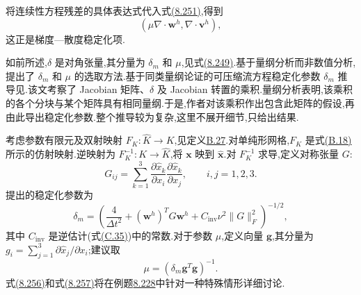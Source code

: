 \begin{note}[梯度—散度稳定化]
\label{note:vms-grad-div-stabilization}
将连续性方程残差的具体表达式代入式\hyperref[eq:vms-residual-based-resolved-formulation]{(8.251)},得到
\[
 (\mu\nabla\cdot\bm{w}^h,\nabla\cdot\bm{v}^h),
\]
这正是梯度—散度稳定化项.
\end{note}

\begin{note}
\label{note:vms-stabilization-parameter}
如前所述,$\delta$ 是对角张量,其分量为 $\delta_m$ 和 $\mu$,见式\hyperref[eq:vms-residual-parameter-tensor]{(8.249)}.\textcite{Bazilevs2007}基于量纲分析而非数值分析,提出了 $\delta_m$ 和 $\mu$ 的选取方法.基于同类量纲论证的可压缩流方程稳定化参数 $\delta_m$ 推导见\textcite{ShakibHughesJohan1991}.该文考察了 Jacobian 矩阵、$\delta$ 及 Jacobian 转置的乘积.量纲分析表明,该乘积的各个分块与某个矩阵具有相同量纲.于是,作者对该乘积作出包含此矩阵的假设,再由此导出稳定化参数.整个推导较为复杂,这里不展开细节,只给出结果.

考虑参数有限元及双射映射 $F_K:\widehat K\to K$,见定义\hyperref[def:appendix-b-27]{B.27}.对单纯形网格,$F_K$ 是式\hyperref[eq:appendix-b-18]{(B.18)}所示的仿射映射.逆映射为 $F_K^{-1}:K\to\widehat K$,将 $\bm{x}$ 映到 $\widehat{\bm{x}}$.对 $F_K^{-1}$ 求导,定义对称张量 $G$:
\[
 G_{ij}=\sum_{k=1}^{3}
 \frac{\partial\widehat{x}_k}{\partial x_i}
 \frac{\partial\widehat{x}_k}{\partial x_j},
 \qquad i,j=1,2,3.
\]
\textcite{Bazilevs2007}提出的稳定化参数为
\begin{equation}\label{eq:vms-momentum-stabilization-parameter}
 \delta_m=\left(
 \frac{4}{\Delta t^2}
 + (\bm{w}^h)^T G\bm{w}^h
 + C_{\mathrm{inv}}\nu^2\|G\|_F^2
 \right)^{-1/2},
\end{equation}
其中 $C_{\mathrm{inv}}$ 是逆估计(式\hyperref[eq:appendix-c-35]{(C.35)})中的常数.对于参数 $\mu$,定义向量 $\bm{g}$,其分量为
$g_i=\sum_{j=1}^{3}\partial\widehat{x}_j/\partial x_i$;\textcite{Bazilevs2007}建议取
\begin{equation}\label{eq:vms-grad-div-stabilization-parameter}
 \mu=(\delta_m\bm{g}^{T}\bm{g})^{-1}.
\end{equation}
式\hyperref[eq:vms-momentum-stabilization-parameter]{(8.256)}和式\hyperref[eq:vms-grad-div-stabilization-parameter]{(8.257)}将在例题\hyperref[ex:vms-axis-aligned-cube]{8.228}中针对一种特殊情形详细讨论.
\end{note}

